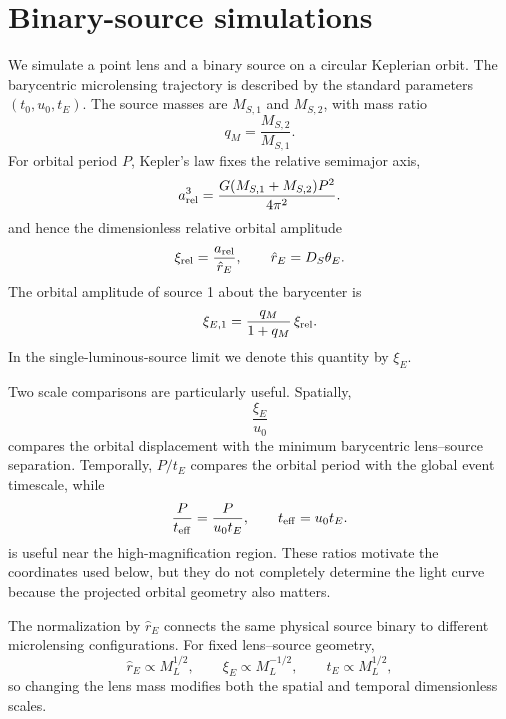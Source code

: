 \documentclass{article}
\begin{document}
\section{Binary-source simulations}
\label{sec:simulations}

We simulate a point lens and a binary source on a circular Keplerian
orbit. The barycentric microlensing trajectory is described by the
standard parameters $(t_0,u_0,t_E)$. The source masses are
$M_{S,1}$ and $M_{S,2}$, with mass ratio
\begin{equation}
q_M=\frac{M_{S,2}}{M_{S,1}}.
\label{eq:qM}
\end{equation}
For orbital period $P$, Kepler's law fixes the relative semimajor axis,
\begin{equation}
a_{\rm rel}^{3}
=
\frac{G(M_{S,1}+M_{S,2})P^{2}}{4\pi^{2}}.
\label{eq:kepler_source}
\end{equation}
and hence the dimensionless relative orbital amplitude
\begin{equation}
\xi_{\rm rel}
=
\frac{a_{\rm rel}}{\hat r_E},
\qquad
\hat r_E=D_S\theta_E.
\label{eq:xi_rel}
\end{equation}
The orbital amplitude of source 1 about the barycenter is
\begin{equation}
\xi_{E,1}
=
\frac{q_M}{1+q_M}\,\xi_{\rm rel}.
\label{eq:xi_E1}
\end{equation}
In the single-luminous-source limit we denote this quantity by
$\xi_E$.

Two scale comparisons are particularly useful. Spatially,
\begin{equation}
\frac{\xi_E}{u_0}
\end{equation}
compares the orbital displacement with the minimum barycentric
lens--source separation. Temporally, $P/t_E$ compares the orbital period
with the global event timescale, while
\begin{equation}
\frac{P}{t_{\rm eff}}
=
\frac{P}{u_0t_E},
\qquad
t_{\rm eff}=u_0t_E.
\label{eq:teff}
\end{equation}
is useful near the high-magnification region. These ratios motivate the
coordinates used below, but they do not completely determine the light
curve because the projected orbital geometry also matters.

The normalization by $\hat r_E$ connects the same physical source binary
to different microlensing configurations. For fixed lens--source
geometry,
\begin{equation}
\hat r_E\propto M_L^{1/2},
\qquad
\xi_E\propto M_L^{-1/2},
\qquad
t_E\propto M_L^{1/2},
\end{equation}
so changing the lens mass modifies both the spatial and temporal
dimensionless scales.
\end{document}
